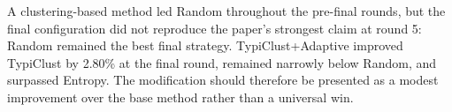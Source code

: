A clustering-based method led Random throughout the pre-final rounds, but the final configuration did not reproduce the paper's strongest claim at round 5: Random remained the best final strategy. TypiClust+Adaptive improved TypiClust by 2.80\% at the final round, remained narrowly below Random, and surpassed Entropy. The modification should therefore be presented as a modest improvement over the base method rather than a universal win.
